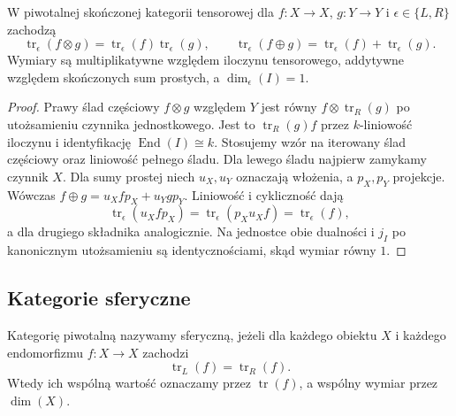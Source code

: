 \begin{wniosek}\label{cat:cor:tf-pivotal-dim-laws}
W piwotalnej skończonej kategorii tensorowej dla $f:X\to X$, $g:Y\to Y$ i $\epsilon\in\{L,R\}$ zachodzą
\[
 \operatorname{tr}_{\epsilon}(f\otimes g)
 =\operatorname{tr}_{\epsilon}(f)\operatorname{tr}_{\epsilon}(g),
 \qquad
 \operatorname{tr}_{\epsilon}(f\oplus g)
 =\operatorname{tr}_{\epsilon}(f)+\operatorname{tr}_{\epsilon}(g).
\]
Wymiary są multiplikatywne względem iloczynu tensorowego, addytywne względem skończonych sum prostych, a $\dim_{\epsilon}(I)=1$.
\end{wniosek}
\begin{proof}
Prawy ślad częściowy $f\otimes g$ względem $Y$ jest równy $f\otimes\operatorname{tr}_R(g)$ po utożsamieniu czynnika jednostkowego. Jest to $\operatorname{tr}_R(g)f$ przez $k$-liniowość iloczynu i identyfikację $\operatorname{End}(I)\cong k$. Stosujemy wzór na iterowany ślad częściowy oraz liniowość pełnego śladu. Dla lewego śladu najpierw zamykamy czynnik $X$. Dla sumy prostej niech $u_X,u_Y$ oznaczają włożenia, a $p_X,p_Y$ projekcje. Wówczas $f\oplus g=u_X f p_X+u_Y g p_Y$. Liniowość i cykliczność dają
\[
 \operatorname{tr}_{\epsilon}(u_X f p_X)
 =\operatorname{tr}_{\epsilon}(p_Xu_X f)
 =\operatorname{tr}_{\epsilon}(f),
\]
a dla drugiego składnika analogicznie. Na jednostce obie dualności i $j_I$ po kanonicznym utożsamieniu są identycznościami, skąd wymiar równy $1$.
\end{proof}

\subsection{Kategorie sferyczne}

\begin{definicja}\label{cat:def:tf-spherical}
Kategorię piwotalną nazywamy sferyczną, jeżeli dla każdego obiektu $X$ i każdego endomorfizmu $f:X\to X$ zachodzi
\[
 \operatorname{tr}_L(f)=\operatorname{tr}_R(f).
\]
Wtedy ich wspólną wartość oznaczamy przez $\operatorname{tr}(f)$, a wspólny wymiar przez $\dim(X)$.
\end{definicja}

